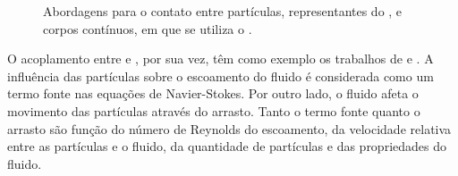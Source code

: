 \begin{figure}[h]
	\caption{Abordagens para o contato entre partículas, representantes do \DEM{}, e corpos contínuos, em que se utiliza o \FEM{}.}
	\centering
	\captionsetup[subfloat]{labelfont=bf}
	\label{fig:method_coupling:images}
\end{figure}

O acoplamento entre \DEM{} e \CFD{}, por sua vez, têm como exemplo os trabalhos de  e . A influência das partículas sobre o escoamento do fluido é considerada como um termo fonte nas equações de Navier-Stokes. Por outro lado, o fluido afeta o movimento das partículas através do arrasto. Tanto o termo fonte quanto o arrasto são função do número de Reynolds do escoamento, da velocidade relativa entre as partículas e o fluido, da quantidade de partículas e das propriedades do fluido.

